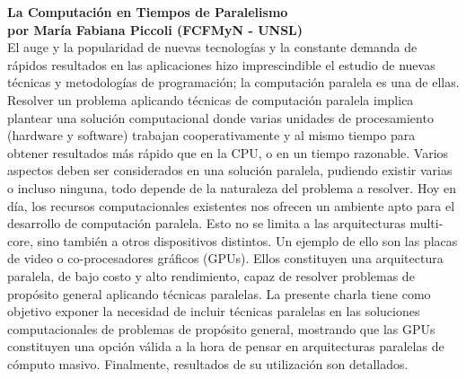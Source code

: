 \documentclass[12pt, a4paper]{article}
\newcommand{\charla}[3]{
	{\large\bf#1}\\
	{\bf por #2}\\
	#3\\
}
\begin{document}
\charla
{La Computación en Tiempos de Paralelismo}
{María Fabiana Piccoli (FCFMyN - UNSL)}
{El auge y la popularidad de nuevas tecnologías y la constante demanda de rápidos resultados en las aplicaciones hizo imprescindible el estudio de nuevas técnicas y metodologías de programación; la computación paralela es una de ellas.
Resolver un problema aplicando técnicas de computación paralela implica plantear una solución computacional donde varias unidades de procesamiento (hardware y software) trabajan cooperativamente y al mismo tiempo para obtener resultados más rápido que en la CPU, o en un tiempo razonable.
Varios aspectos deben ser considerados en una solución paralela, pudiendo existir varias o incluso ninguna, todo depende de la naturaleza del problema a resolver.
Hoy en día, los recursos computacionales existentes nos ofrecen un ambiente apto para el desarrollo de computación paralela. Esto no se limita a las arquitecturas multi-core, sino también a otros dispositivos distintos. Un ejemplo de ello son las placas de video o co-procesadores gráficos (GPUs). Ellos constituyen una arquitectura paralela, de bajo costo y alto rendimiento, capaz de resolver problemas de propósito general aplicando técnicas paralelas.
La presente charla tiene como objetivo exponer la necesidad de incluir técnicas paralelas en las soluciones computacionales de problemas de propósito general, mostrando que las GPUs constituyen una opción válida a la hora de pensar en arquitecturas paralelas de cómputo masivo. Finalmente, resultados de su utilización son detallados.}
\end{document}
